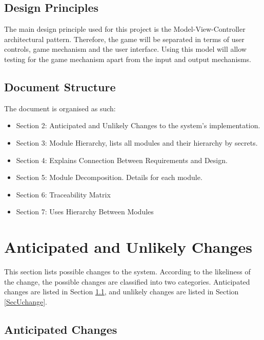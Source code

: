 \documentclass[12pt, titlepage]{article}
\begin{document}
\subsection{Design Principles}

The main design principle used for this project is the Model-View-Controller architectural pattern. Therefore, the game will be separated in terms of user controls, game mechanism and the user interface. Using this model will allow testing for the game mechanism apart from the input and output mechanisms.

\subsection{Document Structure}

The document is organised as such:

\begin{itemize}

\item Section 2: Anticipated and Unlikely Changes to the system's implementation.

\item Section 3: Module Hierarchy, lists all modules and their hierarchy by secrets.

\item Section 4: Explains Connection Between Requirements and Design.

\item Section 5: Module Decomposition. Details for each module.

\item Section 6: Traceability Matrix

\item Section 7: Uses Hierarchy Between Modules

\end{itemize}

\section{Anticipated and Unlikely Changes} \label{SecChange}

This section lists possible changes to the system. According to the likeliness
of the change, the possible changes are classified into two
categories. Anticipated changes are listed in Section \ref{SecAchange}, and
unlikely changes are listed in Section \ref{SecUchange}.

\subsection{Anticipated Changes} \label{SecAchange}
\end{document}
